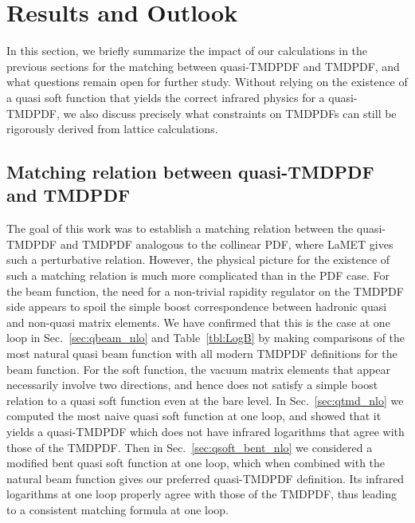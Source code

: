 \documentclass[11pt,a4paper]{article}
\DeclareRobustCommand{\sec}[1]{Sec.~\ref{sec:#1}}
\DeclareRobustCommand{\tbl}[1]{Table~\ref{tbl:#1}}
\begin{document}
\section{Results and Outlook}
\label{sec:results}

In this section, we briefly summarize the impact of our calculations in the previous sections for the matching between quasi-TMDPDF and TMDPDF, and what questions remain open for further study. Without relying on the existence of a quasi soft function that yields the correct infrared physics for a quasi-TMDPDF, we also discuss precisely what constraints on TMDPDFs can still be rigorously derived from lattice calculations.

\subsection{Matching relation between quasi-TMDPDF and TMDPDF}
\label{sec:relation_final}

The goal of this work was to establish a matching relation between the quasi-TMDPDF and TMDPDF analogous to the collinear PDF, where LaMET gives such a perturbative relation.  However, the physical picture for the existence of such a matching relation is much more complicated than in the PDF case. For the beam function, the need for a non-trivial rapidity regulator on the TMDPDF side appears to spoil the simple boost correspondence between hadronic quasi and non-quasi matrix elements. We have confirmed that this is the case at one loop in \sec{qbeam_nlo} and \tbl{LogB} by making comparisons of the most natural quasi beam function with all modern TMDPDF definitions for the beam function. For the soft function, the vacuum matrix elements that appear necessarily involve two directions, and hence does not satisfy a simple boost relation to a quasi soft function even at the bare level. In \sec{qtmd_nlo} we computed the most naive quasi soft function at one loop, and showed that it yields a quasi-TMDPDF which does not have infrared logarithms that agree with those of the TMDPDF.  Then in \sec{qsoft_bent_nlo} we considered a modified bent quasi soft function at one loop, which when combined with the natural beam function gives our  preferred quasi-TMDPDF definition. Its infrared logarithms at one loop properly agree with those of the TMDPDF, thus leading to a consistent matching formula at one loop.
\end{document}
